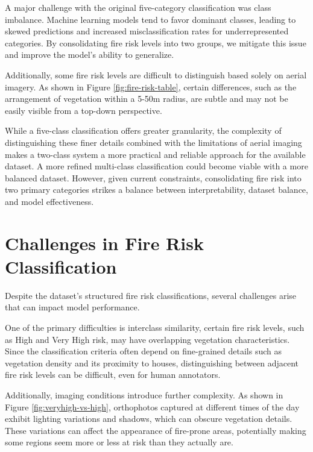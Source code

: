 A major challenge with the original five-category classification was class imbalance. 
Machine learning models tend to favor dominant classes, leading to skewed predictions 
and increased misclassification rates for underrepresented categories. By consolidating 
fire risk levels into two groups, we mitigate this issue and improve the model's ability 
to generalize.

Additionally, some fire risk levels are difficult to distinguish based solely on aerial 
imagery. As shown in Figure \ref{fig:fire-risk-table}, certain differences, such as 
the arrangement of vegetation within a 5-50m radius, are subtle and may not be 
easily visible from a top-down perspective.

While a five-class classification offers greater granularity, the complexity of 
distinguishing these finer details combined with the limitations of aerial 
imaging makes a two-class system a more practical and reliable approach for the 
available dataset. A more refined multi-class classification could become viable with 
a more balanced dataset. 
However, given current constraints, consolidating fire risk into two primary categories 
strikes a balance between interpretability, dataset balance, and model effectiveness.


\section{Challenges in Fire Risk Classification}

Despite the dataset's structured fire risk classifications, several challenges arise 
that can impact model performance.  

One of the primary difficulties is interclass similarity, certain fire risk levels, such 
as High and Very High risk, may have overlapping vegetation characteristics. Since the 
classification criteria often depend on fine-grained details such as vegetation density 
and its proximity to houses, distinguishing between adjacent fire risk levels can be 
difficult, even for human annotators.

Additionally, imaging conditions introduce further complexity. As shown in 
Figure \ref{fig:veryhigh-vs-high}, orthophotos captured at different times of the day 
exhibit lighting variations and shadows, which can obscure vegetation details.  
These variations can affect the appearance of fire-prone areas, potentially making 
some regions seem more or less at risk than they actually are.


